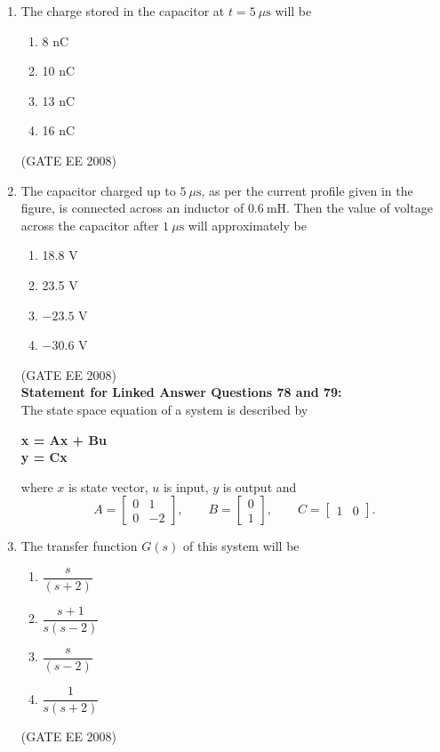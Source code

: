 \documentclass[journal,12pt,onecolumn]{IEEEtran}
\theoremstyle{remark}
\begin{document}
\begin{enumerate}[start=1, label=Q.\arabic*]
\item  The charge stored in the capacitor at $t = 5~\mu\text{s}$ will be
\begin{multicols}{4}
\begin{enumerate}[label=(\Alph*)]
    \item 8 nC
    \item 10 nC
    \item 13 nC
    \item 16 nC
\end{enumerate}
\end{multicols}
\hfill (GATE EE 2008) \\[5mm]

\item The capacitor charged up to $5~\mu\text{s}$, as per the current profile given in the figure, is connected across an inductor of $0.6~\text{mH}$. Then the value of voltage across the capacitor after $1~\mu\text{s}$ will approximately be
\begin{multicols}{4}
\begin{enumerate}[label=(\Alph*)]
    \item 18.8 V
    \item 23.5 V
    \item $-23.5$ V
    \item $-30.6$ V
\end{enumerate}
\end{multicols}
\hfill (GATE EE 2008) \\[5mm]

\textbf{Statement for Linked Answer Questions 78 and 79:}\\

The state space equation of a system is described by
\begin{center}
\textbf{x = Ax + Bu}\\
\textbf{y = Cx}\\
\end{center}
where $x$ is state vector, $u$ is input, $y$ is output and
\[
A=\begin{bmatrix}0&1\\[2pt]0&-2\end{bmatrix},\qquad
B=\begin{bmatrix}0\\[2pt]1\end{bmatrix},\qquad
C=\begin{bmatrix}1&0\end{bmatrix}.
\]

\item The transfer function $G(s)$ of this system will be
\begin{multicols}{4}
\begin{enumerate}[label=(\Alph*)]
    \item $\dfrac{s}{(s+2)}$
    \item $\dfrac{s+1}{s(s-2)}$
    \item $\dfrac{s}{(s-2)}$
    \item $\dfrac{1}{s(s+2)}$
\end{enumerate}
\end{multicols}
\hfill (GATE EE 2008) \\[5mm]



\end{enumerate}
\end{document}

